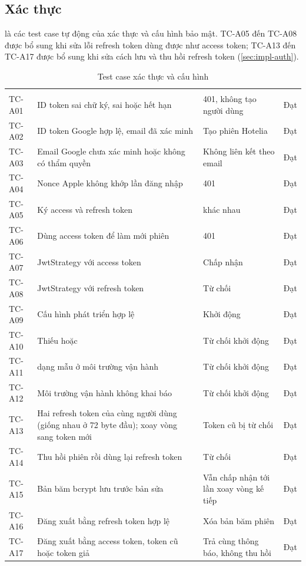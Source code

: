 \subsection{Xác thực}

 là các test case tự động của xác thực và cấu hình bảo mật. TC-A05 đến TC-A08 được bổ sung khi sửa lỗi refresh token dùng được như access token; TC-A13 đến TC-A17 được bổ sung khi sửa cách lưu và thu hồi refresh token (\cref{sec:impl-auth}).

\begin{rtable}
\begin{longtable}{|C{1.4cm}|L{8.0cm}|L{3.6cm}|C{1.6cm}|}
\caption{Test case xác thực và cấu hình}\label{tab:test-auth}\\
\hline
{} &  &  &  \\ \hline
\endfirsthead
\hline
{} &  &  &  \\ \hline
\endhead
TC-A01 & ID token sai chữ ký, sai  hoặc hết hạn & 401, không tạo người dùng & Đạt \\ \hline
TC-A02 & ID token Google hợp lệ, email đã xác minh & Tạo phiên Hotelia & Đạt \\ \hline
TC-A03 & Email Google chưa xác minh hoặc không có thẩm quyền & Không liên kết theo email & Đạt \\ \hline
TC-A04 & Nonce Apple không khớp lần đăng nhập & 401 & Đạt \\ \hline
TC-A05 & Ký access và refresh token &  khác nhau & Đạt \\ \hline
TC-A06 & Dùng access token để làm mới phiên & 401 & Đạt \\ \hline
TC-A07 & JwtStrategy với access token & Chấp nhận & Đạt \\ \hline
TC-A08 & JwtStrategy với refresh token & Từ chối & Đạt \\ \hline
TC-A09 & Cấu hình phát triển hợp lệ & Khởi động & Đạt \\ \hline
TC-A10 & Thiếu  hoặc  & Từ chối khởi động & Đạt \\ \hline
TC-A11 &  dạng mẫu ở môi trường vận hành & Từ chối khởi động & Đạt \\ \hline
TC-A12 & Môi trường vận hành không khai báo  & Từ chối khởi động & Đạt \\ \hline
TC-A13 & Hai refresh token của cùng người dùng (giống nhau ở 72 byte đầu); xoay vòng sang token mới & Token cũ bị từ chối & Đạt \\ \hline
TC-A14 & Thu hồi phiên rồi dùng lại refresh token & Từ chối & Đạt \\ \hline
TC-A15 & Bản băm bcrypt lưu trước bản sửa & Vẫn chấp nhận tới lần xoay vòng kế tiếp & Đạt \\ \hline
TC-A16 & Đăng xuất bằng refresh token hợp lệ & Xóa bản băm phiên & Đạt \\ \hline
TC-A17 & Đăng xuất bằng access token, token cũ hoặc token giả & Trả cùng thông báo, không thu hồi & Đạt \\ \hline
\end{longtable}
\end{rtable}

